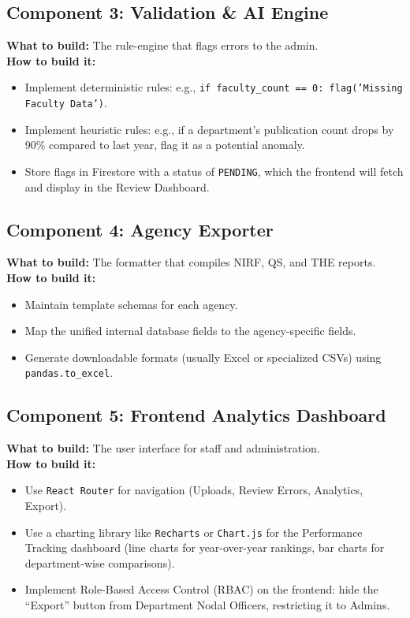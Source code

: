 \documentclass[11pt,a4paper]{article}
\begin{document}
\subsection{Component 3: Validation \& AI Engine}
\textbf{What to build:} The rule-engine that flags errors to the admin. \\
\textbf{How to build it:}
\begin{itemize}
    \item Implement deterministic rules: e.g., \texttt{if faculty\_count == 0: flag('Missing Faculty Data')}.
    \item Implement heuristic rules: e.g., if a department's publication count drops by 90\% compared to last year, flag it as a potential anomaly.
    \item Store flags in Firestore with a status of \texttt{PENDING}, which the frontend will fetch and display in the Review Dashboard.
\end{itemize}

\subsection{Component 4: Agency Exporter}
\textbf{What to build:} The formatter that compiles NIRF, QS, and THE reports. \\
\textbf{How to build it:}
\begin{itemize}
    \item Maintain template schemas for each agency.
    \item Map the unified internal database fields to the agency-specific fields.
    \item Generate downloadable formats (usually Excel or specialized CSVs) using \texttt{pandas.to\_excel}.
\end{itemize}

\subsection{Component 5: Frontend Analytics Dashboard}
\textbf{What to build:} The user interface for staff and administration. \\
\textbf{How to build it:}
\begin{itemize}
    \item Use \texttt{React Router} for navigation (Uploads, Review Errors, Analytics, Export).
    \item Use a charting library like \texttt{Recharts} or \texttt{Chart.js} for the Performance Tracking dashboard (line charts for year-over-year rankings, bar charts for department-wise comparisons).
    \item Implement Role-Based Access Control (RBAC) on the frontend: hide the ``Export'' button from Department Nodal Officers, restricting it to Admins.
\end{itemize}
\end{document}
